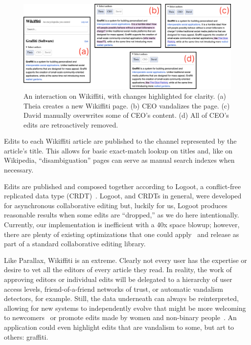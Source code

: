 \begin{figure}[htb]
    \centering
    \includegraphics[width=\textwidth]{paper/figures/wikiffiti.png}
    \caption{
    An interaction on Wikiffiti, with changes highlighted for clarity.
    (a) Theia creates a new Wikiffiti page. (b) CEO vandalizes the page. (c) David manually overwrites some of
    CEO's content. (d) All of CEO's edits are retroactively removed.}
    \label{case-studies:fig:wikiffiti}
\end{figure}

Edits to each Wikiffiti article are published to
the channel represented by the article's title.
This allows for basic exact-match lookup on titles and, like on Wikipedia,
``disambiguation'' pages can serve as manual search indexes when necessary.

Edits are published and composed together according to Logoot,
a conflict-free replicated data type (CRDT)~\cite{logoot,crdts}.
Logoot, and CRDTs in general, were developed for asynchronous collaborative editing
but, luckily for us, Logoot produces reasonable results when
some edits are ``dropped,'' as we do here intentionally.
Currently, our implementation is inefficient with a 40x space blowup;
however, there are plenty of existing optimizations that one could apply~\cite{logootbetter}
and release as part of a standard collaborative editing library.

Like Parallax, Wikiffiti is an extreme. Clearly not every user
has the expertise or desire to vet all the editors of
every article they read. In reality, the work of approving editors
or individual edits will be delegated to
a hierarchy of user access levels,
friend-of-a-friend networks of trust,
or automatic vandalism detectors, for example.
Still, the data underneath can always be reinterpreted, allowing
for new systems to independently evolve that
might be more welcoming to newcomers~\cite{wikibourgeoisie, wikirisedecline}
or promote edits made by women and non-binary people~\cite{wikigender}.
An application could even highlight edits that are vandalism to some,
but art to others: graffiti.




